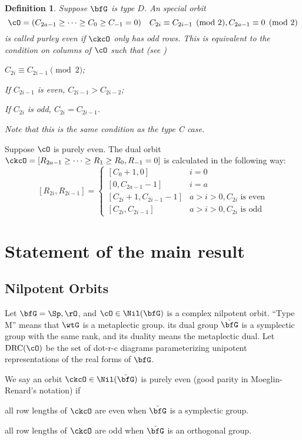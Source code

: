 \documentclass[12pt,a4paper]{amsart}
\def\ckbfG{\check{\bfG}}
\numberwithin{equation}{section}
\newtheorem{defn}[thm]{Definition}
\theoremstyle{remark}
\def\drc{\mathrm{DRC}}
\begin{document}
{\begin{defn}
  Suppose $\bfG$ is type $D$.  An special orbit
  \[
    \cO=(C_{2a-1}\ge\dots \ge C_0\geq C_{-1}=0) \quad C_{2i}\equiv
    C_{2i-1}\pmod{2}, C_{2a-1} \equiv 0 \pmod{2}
  \]
  is called purley even if
  $\ckcO$ only has odd rows.
  This is equivalent to the condition on columns of $\cO$ such that (see )
  \begin{enumC}
  \item $C_{2i} \equiv C_{2i-1} \pmod{2}$; 
  \item 
   If $C_{2i-1}$ is even,  $C_{2i-1} > C_{2i-2}$; 
  \item
    If $C_{2i}$ is odd, $C_{2i}=C_{2i-1}$. 
  \end{enumC}
  Note that this is the same condition as the type C case. 
\end{defn}


Suppose $\cO$ is purely even. 
The dual orbit 
$\ckcO = [R_{2a-1}\geq \cdots \geq R_1\geq R_0, R_{-1}=0]$
is calculated in the following way: 
\[
  [R_{2i},R_{2i-1}] = \begin{cases}
    [C_0+1, 0] & i=0\\
    [0, C_{2a-1}-1] & i = a \\
    [C_{2i}+1, C_{2i-1}-1] & a> i>0, C_{2i} \text{ is even} \\
    [C_{2i},C_{2i-1}] & a>i>0, C_{2i} \text{ is odd}
  \end{cases}
\]
}


\section{Statement of the main result}
\subsection{Nilpotent Orbits}
Let $\bfG = \Sp,  \rO$, and $\cO\in \Nil(\bfG)$ is a complex nilpotent
orbit.
``Type M'' means that $\wtG$ is a metaplectic group. its dual group $\ckbfG$ is a symplectic
group with the same rank, and its duality means the metaplectic dual.
Let $\drc(\cO)$ be the set of dot-r-c diagrams parameterizing unipotent
representations of the real forms of $\bfG$.

We say an orbit $\ckcO\in \Nil(\ckbfG)$ is purely even (good parity in
Moeglin-Renard's notation) if
\begin{des}
 \item[] all row lengths of $\ckcO$ are even when $\ckbfG$ is a symplectic group.
 \item[]  all row lengths of $\ckcO$ are odd when $\ckbfG$ is an orthogonal group.
\end{des}
\end{document}
